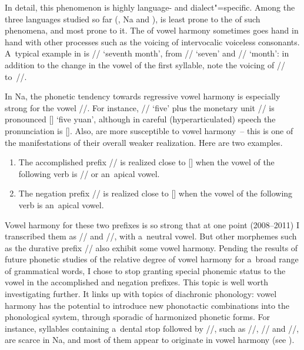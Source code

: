 			In detail, this phenomenon is highly language- and dialect"=specific. Among the three 
			languages studied so far (, Na and \ili{Naxi}),  is least prone to the  of such
			phenomena, and  most prone to it. The  of vowel harmony sometimes goes hand in
			hand with other processes such as the voicing of intervocalic voiceless consonants. A~typical
			example in  is // ‘seventh month’, from // ‘seven’ and
			// ‘month’: in addition to the change in the vowel of the first syllable, note the
			voicing of // to~//.
			
			In Na, the phonetic tendency towards regressive vowel harmony is especially strong for the vowel
			//. For instance, // ‘five’ plus the monetary unit // is pronounced
			[] ‘five yuan’, although in careful (hyperarticulated) speech the pronunciation is
			[]. Also,  are more susceptible to vowel harmony~-- this is one of the
			manifestations of their overall weaker realization. Here are two examples.
			
			\begin{enumerate}[label=(\roman*)]
				\item  The
				{accomplished} prefix // is realized close to [] when the vowel of the following
				verb is // or an~apical vowel.
				
				\item  The {negation} prefix
				// is realized close to [] when the vowel of the following verb is an~apical
				vowel.
				
			\end{enumerate}
			
			Vowel harmony for these two prefixes is so strong that at one point (2008--2011) I transcribed them as // and  //, with a~neutral vowel. But other morphemes such as the {durative} prefix // also exhibit some vowel harmony. Pending the results of future phonetic studies of the relative degree of vowel harmony for a~broad range of grammatical words, I chose to stop granting special phonemic status to the vowel in the
			{accomplished} and {negation} prefixes. This topic is well worth investigating further. It links up with topics of {diachronic} phonology: vowel harmony has the potential to introduce new phonotactic combinations into the phonological system, through sporadic  of harmonized phonetic forms. For
			instance, syllables containing a~dental stop followed by //, such as //, //
			and //, are scarce in Na, and most of them appear to originate in vowel harmony (see
			).
			

